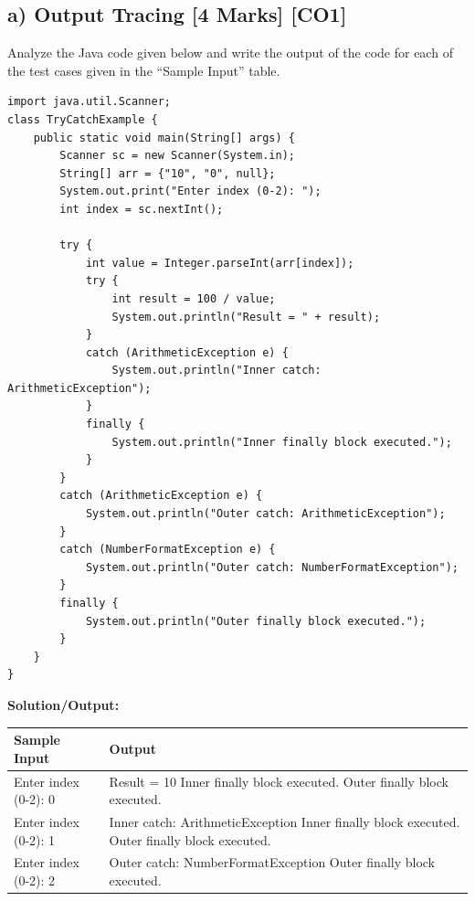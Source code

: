 \documentclass[11pt,a4paper]{article}
\begin{document}
\subsection*{a) Output Tracing [4 Marks] [CO1]}
Analyze the Java code given below and write the output of the code for each of the test cases given in the ``Sample Input'' table.
\begin{lstlisting}
import java.util.Scanner;
class TryCatchExample {
    public static void main(String[] args) {
        Scanner sc = new Scanner(System.in);
        String[] arr = {"10", "0", null};
        System.out.print("Enter index (0-2): ");
        int index = sc.nextInt();
        
        try {
            int value = Integer.parseInt(arr[index]);
            try {
                int result = 100 / value;
                System.out.println("Result = " + result);
            } 
            catch (ArithmeticException e) {
                System.out.println("Inner catch: ArithmeticException");
            } 
            finally {
                System.out.println("Inner finally block executed.");
            }
        } 
        catch (ArithmeticException e) {
            System.out.println("Outer catch: ArithmeticException");
        } 
        catch (NumberFormatException e) {
            System.out.println("Outer catch: NumberFormatException");
        } 
        finally {
            System.out.println("Outer finally block executed.");
        }
    }
}
\end{lstlisting}
\vspace{0.3cm}

\noindent\textbf{Solution/Output:}
\begin{table}[h]
\centering
\renewcommand{\arraystretch}{1.5}
\begin{tabularx}{\textwidth}{|l|X|}
\hline
\textbf{Sample Input} & \textbf{Output} \\ \hline
Enter index (0-2): 0 & Result = 10 \newline Inner finally block executed. \newline Outer finally block executed. \\ \hline
Enter index (0-2): 1 & Inner catch: ArithmeticException \newline Inner finally block executed. \newline Outer finally block executed. \\ \hline
Enter index (0-2): 2 & Outer catch: NumberFormatException \newline Outer finally block executed. \\ \hline
\end{tabularx}
\end{table}
\end{document}
